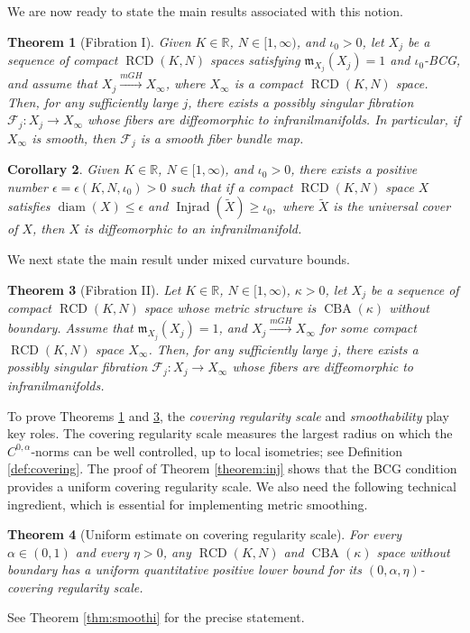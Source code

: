 \documentclass[11pt,reqno]{amsart}
\newtheorem{theorem}{Theorem}[section]
\newtheorem{corollary}[theorem]{Corollary}
\theoremstyle{definition}
\numberwithin{equation}{section}
\newcommand{\dR}{\mathbb{R}}
\newcommand{\fm}{\mathfrak{m}}
\newcommand{\meas}{\mathfrak{m}}
\DeclareMathOperator{\CBA}{CBA}
\DeclareMathOperator{\diam}{diam}
\DeclareMathOperator{\Injrad}{Injrad}
\DeclareMathOperator{\RCD}{RCD}
\begin{document}
We are now ready to state the main results associated with this notion. 

\begin{theorem}[Fibration I]\label{fibration} Given $K \in  \dR$, $N \in [1, \infty)$, and $\iota_0 > 0$,
let $X_j$ be a sequence of compact $\RCD(K, N)$ spaces satisfying $\fm_{X_j}(X_j) = 1$ 
and $\iota_0$-BCG, and assume that $X_j \xrightarrow{mGH} X_{\infty}$, where $X_{\infty}$ is a compact $\RCD(K, N)$ space. 
Then, for any sufficiently large $j$, 
there exists a possibly singular fibration $\mathscr{F}_j : X_j \to X_{\infty}$ whose fibers are diffeomorphic to infranilmanifolds. In particular, if $X_{\infty}$ is smooth, then $\mathscr{F}_j$ is a smooth fiber bundle map.
\end{theorem} 
\begin{corollary}\label{corinfl} Given $K \in  \dR$, $N  \in [1, \infty) $, and $\iota_0 > 0$, there exists  
a positive number $\epsilon = \epsilon (K, N, \iota_0) > 0$ such that if  a compact $\RCD(K, N)$ space $X$ satisfies 
$
\diam(X) \leq \epsilon$
 and $\Injrad(\widetilde{X}) \geq \iota_0, 
$
where $\widetilde{X}$ is the universal cover of $X$, then $X$ is diffeomorphic to an infranilmanifold.
\end{corollary}

We next state the main result under mixed curvature bounds.

\begin{theorem}
[Fibration II]\label{fibr}  Let $K \in  \dR$, $N \in [1, \infty)$, $\kappa > 0$,  
let $X_j$ be a sequence of compact $\RCD(K, N)$ space whose metric structure is $\CBA(\kappa)$ without boundary. Assume that $\meas_{X_j}(X_j)=1$, and  $X_j \xrightarrow{mGH} X_{\infty}$ for some compact $\RCD(K, N)$ space $X_{\infty}$. 
Then, for any sufficiently large $j$, 
there exists a possibly singular fibration $\mathscr{F}_j : X_j \to X_{\infty}$ whose fibers are diffeomorphic to infranilmanifolds.  
\end{theorem}

To prove Theorems \ref{fibration} and \ref{fibr}, the \textit{covering regularity scale} and \textit{smoothability} play key roles. The covering regularity scale measures the largest radius on which the $C^{0,\alpha}$-norms can be well controlled, up to local isometries;
see Definition \ref{def:covering}. The proof of Theorem \ref{theorem:inj} shows that the BCG condition provides a uniform covering regularity scale. We also need the following technical ingredient, which is essential for implementing metric smoothing.
\begin{theorem}[Uniform estimate on covering regularity scale]
For every $\alpha \in (0,1)$ and every $\eta>0$,
    any $\RCD(K, N)$ and $\CBA(\kappa)$ space without boundary has a uniform quantitative positive lower bound for its $(0,\alpha, \eta)$-covering regularity scale. 
\end{theorem}
See Theorem \ref{thm:smoothi} for the precise statement.
\end{document}

